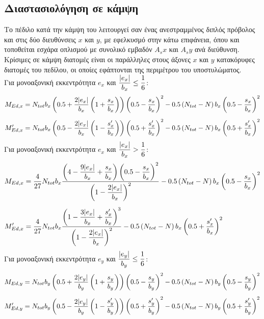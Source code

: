 \subsection{Διαστασιολόγηση σε κάμψη}
Το πέδιλο κατά την κάμψη του λειτουργεί σαν ένας ανεστραμμένος διπλός πρόβολος και στις δύο διευθύνσεις $x$ και $y$, με εφελκυσμό στην κάτω επιφάνεια, όπου και τοποθείται εσχάρα οπλισμού με συνολικό εμβαδόν $A_sx$ και $A_sy$ ανά διεύθυνση. Κρίσιμες σε κάμψη διατομές είναι οι παράλληλες στους άξονες $x$ και $y$ κατακόρυφες διατομές του πεδίλου, οι οποίες εφάπτονται της περιμέτρου του υποστυλώματος.\\
Για μονοαξονική εκκεντρότητα $e_x$ και $\dfrac{\lvert e_x\rvert}{b_x} \leq \dfrac{1}{6}$:
\begin{subequations}
\begin{align}
  M_{Ed,x} & = N_{tot}b_x\left(0.5 + \dfrac{2\lvert e_x\rvert}{b_x}\left(1 + \dfrac{s_x}{b_x}\right)\right)\left(0.5 - \dfrac{s_x}{b_x}\right)^2 - 0.5 \left(N_{tot} - N\right)b_x\left(0.5 - \dfrac{s_x}{b_x}\right)^2 \label{eqn:222a}\\[5pt]
  M'_{Ed,x} & = N_{tot}b_x\left(0.5 - \dfrac{2\lvert e_x\rvert}{b_x}\left(1 - \dfrac{s'_x}{b_x}\right)\right)\left(0.5 + \dfrac{s'_x}{b_x}\right)^2 - 0.5 \left(N_{tot} - N\right)b_x\left(0.5 + \dfrac{s'_x}{b_x}\right)^2 \label{eqn:222b}
\end{align}
\end{subequations}
Για μονοαξονική εκκεντρότητα $e_x$ και $\dfrac{\lvert e_x\rvert}{b_x} > \dfrac{1}{6}$:
\begin{subequations}
\begin{align}
  M_{Ed,x} & = \dfrac{4}{27}N_{tot}b_x\dfrac{\left(4 - \dfrac{9\lvert e_x\rvert}{b_x} + \dfrac{s_x}{b_x}\right)\left(0.5 - \dfrac{s_x}{b_x}\right)^2}{\left(1-\dfrac{2\lvert e_x\rvert}{b_x}\right)^2} - 0.5\left(N_{tot} - N\right)b_x\left(0.5 - \dfrac{s_x}{b_x}\right)^2 \label{eqn:223a}\\[5pt]
  M'_{Ed,x} & = \dfrac{4}{27}N_{tot}b_x\dfrac{\left(1 - \dfrac{3\lvert e_x\rvert}{b_x} + \dfrac{s'_x}{b_x}\right)^3}{\left(1-\dfrac{2\lvert e_x\rvert}{b_x}\right)^2} - 0.5\left(N_{tot} - N\right)b_x\left(0.5 + \dfrac{s'_x}{b_x}\right)^2 \label{eqn:223b}
\end{align}
\end{subequations}
Για μονοαξονική εκκεντρότητα $e_y$ και $\dfrac{\lvert e_y\rvert}{b_y} \leq \dfrac{1}{6}$:
\begin{subequations}
\begin{align}
  M_{Ed,y} & = N_{tot}b_y\left(0.5 + \dfrac{2\lvert e_y\rvert}{b_y}\left(1 + \dfrac{s_y}{b_y}\right)\right)\left(0.5 - \dfrac{s_y}{b_y}\right)^2 - 0.5 \left(N_{tot} - N\right)b_y\left(0.5 - \dfrac{s_y}{b_y}\right)^2 \label{eqn:224a}\\[5pt]
  M'_{Ed,y} & = N_{tot}b_y\left(0.5 - \dfrac{2\lvert e_y\rvert}{b_y}\left(1 - \dfrac{s'_y}{b_y}\right)\right)\left(0.5 + \dfrac{s'_y}{b_y}\right)^2 - 0.5 \left(N_{tot} - N\right)b_y\left(0.5 + \dfrac{s'_y}{b_y}\right)^2 \label{eqn:224b}
\end{align}
\end{subequations}
